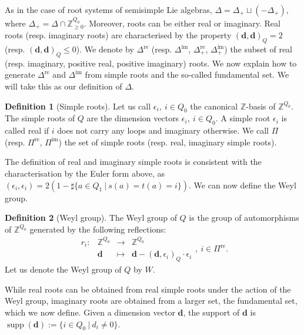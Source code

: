 \documentclass[11pt,english]{article}
\numberwithin{equation}{section}
\numberwithin{figure}{section}
\theoremstyle{definition}
\newtheorem{df}{Definition}[subsection]
\theoremstyle{plain}
\theoremstyle{remark}
\DeclareMathOperator{\supp}{supp}
\newcommand\dd{\mathbf{d}}
\newcommand\ZZ{\mathbb{Z}}
\begin{document}
As in the case of root systems of semisimple Lie algebras, $\Delta=\Delta_{+}\sqcup(-\Delta_{+})$,
where $\Delta_{+}=\Delta\cap\ZZ_{\geq0}^{Q_{0}}$. Moreover, roots
can be either real or imaginary. Real roots (resp. imaginary roots)
are characterised by the property $(\dd,\dd)_{Q}=2$ (resp. $(\dd,\dd)_{Q}\leq0$).
We denote by $\Delta^{\mathrm{re}}$ (resp. $\Delta^{\mathrm{im}}$,
$\Delta_{+}^{\mathrm{re}}$, $\Delta_{+}^{\mathrm{im}}$) the subset
of real (resp. imaginary, positive real, positive imaginary) roots.
We now explain how to generate $\Delta^{\mathrm{re}}$ and $\Delta^{\mathrm{im}}$
from simple roots and the so-called fundamental set. We will take
this as our definition of $\Delta$.

\begin{df}[Simple roots]

Let us call $\epsilon_{i},\ i\in Q_{0}$ the canonical $\ZZ$-basis
of $\ZZ^{Q_{0}}$. The simple roots of $Q$ are the dimension vectors
$\epsilon_{i},\ i\in Q_{0}$. A simple root $\epsilon_{i}$ is called
real if $i$ does not carry any loops and imaginary otherwise. We
call $\Pi$ (resp. $\Pi^{\mathrm{re}}$, $\Pi^{\mathrm{im}}$) the
set of simple roots (resp. real, imaginary simple roots).

\end{df}

The definition of real and imaginary simple roots is consistent with
the characterisation by the Euler form above, as $(\epsilon_{i},\epsilon_{i})=2(1-\sharp\{a\in Q_{1}\ \vert\ s(a)=t(a)=i\})$.
We can now define the Weyl group.

\begin{df}[Weyl group]

The Weyl group of $Q$ is the group of automorphisms of $\ZZ^{Q_{0}}$
generated by the following reflections:\[
\begin{array}{cccc}
r_i: & \ZZ^{Q_0} & \rightarrow & \ZZ^{Q_0} \\
& \dd & \mapsto & \dd-(\dd,\epsilon_i)_Q\cdot \epsilon_i
\end{array}
,\ i\in\Pi^{\mathrm{re}}.
\] Let us denote the Weyl group of $Q$ by $W$.

\end{df}

While real roots can be obtained from real simple roots under the
action of the Weyl group, imaginary roots are obtained from a larger
set, the fundamental set, which we now define. Given a dimension vector
$\dd$, the support of $\dd$ is $\supp(\dd):=\{i\in Q_{0}\ \vert\ d_{i}\ne0\}$.
\end{document}
